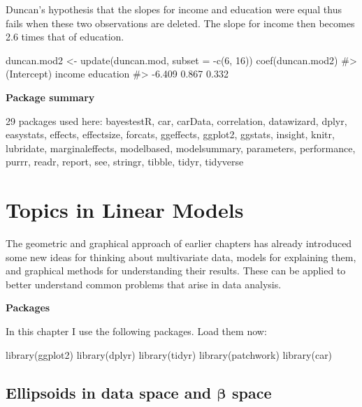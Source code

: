 \documentclass[
  letterpaper,
  10pt,
  krantz2]{krantz}
\makeatletter
\newenvironment{Shaded}{\begin{snugshade}}{\end{snugshade}}
\newcommand{\AttributeTok}[1]{\textcolor[rgb]{0.40,0.45,0.13}{#1}}
\newcommand{\CommentTok}[1]{\textcolor[rgb]{0.37,0.37,0.37}{#1}}
\newcommand{\DecValTok}[1]{\textcolor[rgb]{0.68,0.00,0.00}{#1}}
\newcommand{\FunctionTok}[1]{\textcolor[rgb]{0.28,0.35,0.67}{#1}}
\newcommand{\NormalTok}[1]{\textcolor[rgb]{0.00,0.23,0.31}{#1}}
\newcommand{\OtherTok}[1]{\textcolor[rgb]{0.00,0.23,0.31}{#1}}
\newcommand{\SpecialCharTok}[1]{\textcolor[rgb]{0.37,0.37,0.37}{#1}}
\newenvironment{kframe}{%
  \medskip{}
  \setlength{\fboxsep}{.8em}
  \def\at@end@of@kframe{}%
  \ifinner\ifhmode%
  \def\at@end@of@kframe{\end{minipage}}%
  \begin{minipage}{\columnwidth}%
  \fi\fi%
  \def\FrameCommand##1{\hskip\@totalleftmargin \hskip-\fboxsep
  \colorbox{shadecolor}{##1}\hskip-\fboxsep
      \hskip-\linewidth \hskip-\@totalleftmargin \hskip\columnwidth}%
  \MakeFramed {\advance\hsize-\width
    \@totalleftmargin\z@ \linewidth\hsize
    \@setminipage}}%
{\par\unskip\endMakeFramed%
  \at@end@of@kframe}
\renewenvironment{Shaded}{\begin{kframe}}{\end{kframe}}
\makeatother
\begin{document}
Duncan's hypothesis that the slopes for income and education were equal
thus fails when these two observations are deleted. The slope for income
then becomes 2.6 times that of education.

\begin{Shaded}
\begin{Highlighting}[]
\NormalTok{duncan.mod2 }\OtherTok{\textless{}{-}} \FunctionTok{update}\NormalTok{(duncan.mod, }\AttributeTok{subset =} \SpecialCharTok{{-}}\FunctionTok{c}\NormalTok{(}\DecValTok{6}\NormalTok{, }\DecValTok{16}\NormalTok{))}
\FunctionTok{coef}\NormalTok{(duncan.mod2)}
\CommentTok{\#\textgreater{} (Intercept)      income   education }
\CommentTok{\#\textgreater{}      {-}6.409       0.867       0.332}
\end{Highlighting}
\end{Shaded}

\textbf{Package summary}

29 packages used here: bayestestR, car, carData, correlation,
datawizard, dplyr, easystats, effects, effectsize, forcats, ggeffects,
ggplot2, ggstats, insight, knitr, lubridate, marginaleffects,
modelbased, modelsummary, parameters, performance, purrr, readr, report,
see, stringr, tibble, tidyr, tidyverse

\chapter{Topics in Linear Models}\label{topics-in-linear-models}

The geometric and graphical approach of earlier chapters has already
introduced some new ideas for thinking about multivariate data, models
for explaining them, and graphical methods for understanding their
results. These can be applied to better understand common problems that
arise in data analysis.

\textbf{Packages}

In this chapter I use the following packages. Load them now:

\begin{Shaded}
\begin{Highlighting}[]
\FunctionTok{library}\NormalTok{(ggplot2)}
\FunctionTok{library}\NormalTok{(dplyr)}
\FunctionTok{library}\NormalTok{(tidyr)}
\FunctionTok{library}\NormalTok{(patchwork)}
\FunctionTok{library}\NormalTok{(car)}
\end{Highlighting}
\end{Shaded}

\section{\texorpdfstring{Ellipsoids in data space and \(\mathbf{\beta}\)
space}{Ellipsoids in data space and \textbackslash mathbf\{\textbackslash beta\} space}}\label{sec:betaspace}
\end{document}
